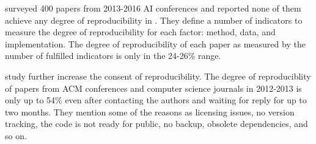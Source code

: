 \citet{gundersenStateArtReproducibility2018} surveyed 400 papers from 2013-2016 AI conferences and reported none of them achieve any degree of reproducibility in .
They define a number of indicators to measure the degree of reproducibility for each factor: method, data, and implementation.
The degree of reproducibility of each paper as measured by the number of fulfilled indicators is only in the 24-26\% range.

\citet{collbergRepeatabilityComputerSystems2016} study further increase the consent of reproducibility.
The degree of reproduciblity of papers from ACM conferences and computer science journals in 2012-2013 is only up to 54\% even after contacting the authors and waiting for reply for up to two months.
They mention some of the reasons as licensing issues, no version tracking, the code is not ready for public, no backup, obsolete dependencies, and so on.

